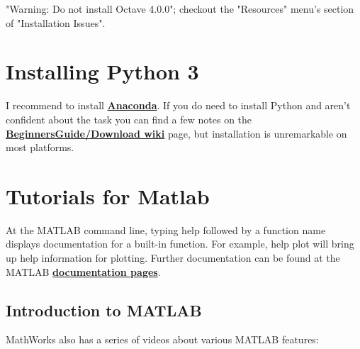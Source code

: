 \documentclass[11pt]{article}
\begin{document}
"Warning: Do not install Octave 4.0.0"; checkout the "Resources" menu's
section of "Installation Issues".

\section{Installing Python 3}\label{installing-python-3}

I recommend to install
\textbf{\href{https://www.anaconda.com/download/}{Anaconda}}. If you do
need to install Python and aren't confident about the task you can find
a few notes on the
\textbf{\href{https://wiki.python.org/moin/BeginnersGuide/Download}{BeginnersGuide/Download
wiki}} page, but installation is unremarkable on most platforms.

    \section{Tutorials for Matlab}\label{tutorials-for-matlab}

At the MATLAB command line, typing help followed by a function name
displays documentation for a built-in function. For example, help plot
will bring up help information for plotting. Further documentation can
be found at the MATLAB
\textbf{\href{http://www.mathworks.com/help/matlab/}{documentation
pages}}.

\subsection{Introduction to MATLAB}\label{introduction-to-matlab}

MathWorks also has a series of videos about various MATLAB features:
\end{document}
